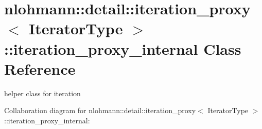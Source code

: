 \hypertarget{classnlohmann_1_1detail_1_1iteration__proxy_1_1iteration__proxy__internal}{}\section{nlohmann\+:\+:detail\+:\+:iteration\+\_\+proxy$<$ Iterator\+Type $>$\+:\+:iteration\+\_\+proxy\+\_\+internal Class Reference}
\label{classnlohmann_1_1detail_1_1iteration__proxy_1_1iteration__proxy__internal}


helper class for iteration  




Collaboration diagram for nlohmann\+:\+:detail\+:\+:iteration\+\_\+proxy$<$ Iterator\+Type $>$\+:\+:iteration\+\_\+proxy\+\_\+internal\+:
